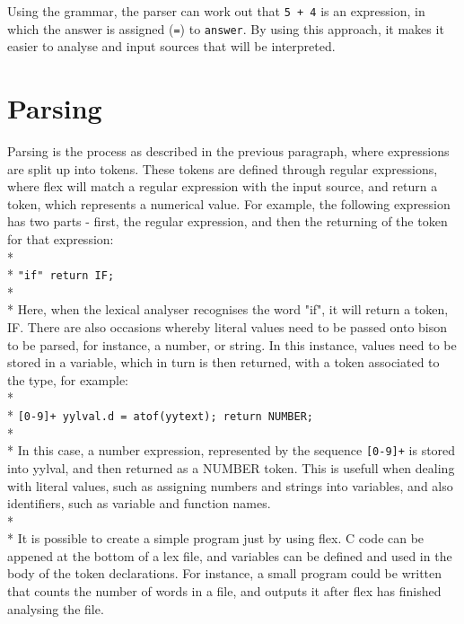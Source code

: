 \documentclass[12pt]{report}
\begin{document}
Using the grammar, the parser can work out that \texttt{5 + 4} is an expression, in which the answer is assigned (\texttt{=}) to \texttt{answer}.  By using this approach, it makes it easier to analyse and input sources that will be interpreted.
\section{Parsing}\label{sec:parsing}
Parsing is the process as described in the previous paragraph, where expressions are split up into tokens.  These tokens are defined through regular expressions, where flex will match a regular expression with the input source, and return a token, which represents a numerical value.
For example, the following expression has two parts - first, the regular expression, and then the returning of the token for that expression:
\\*
\\*
\texttt{"if" \quad\quad return IF;}
\\*
\\*
Here, when the lexical analyser recognises the word "if", it will return a token, IF.  There are also occasions whereby literal values need to be passed onto bison to be parsed, for instance, a number, or string.  In this instance, values need to be stored in a variable, which in turn is then returned, with a token associated to the type, for example:
\\*
\\*
\texttt{[0-9]+ \quad\quad yylval.d = atof(yytext); return NUMBER;}
\\*
\\*
In this case, a number expression, represented by the sequence \texttt{[0-9]+} is stored into yylval, and then returned as a NUMBER token.  This is usefull when dealing with 
literal values, such as assigning numbers and strings into variables, and also identifiers, such as variable and function names.
\\*
\\*
It is possible to create a simple program just by using flex.  C code can be appened at the bottom of a lex file, and variables can be defined and used in the body of the token declarations.  For instance, a small program could be written that counts the number of words in a file, and outputs it after flex has finished analysing the file.
\end{document}
